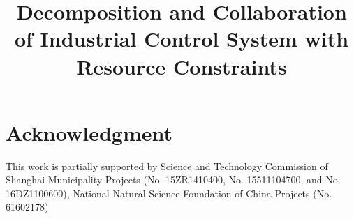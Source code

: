 \documentclass[conference]{IEEEtran}
\begin{document}

\title{Decomposition and Collaboration of Industrial Control System with Resource Constraints}




\maketitle


\IEEEpeerreviewmaketitle


%

%
%




\section*{Acknowledgment}
This work is partially supported by Science and Technology Commission of Shanghai Municipality Projects (No. 15ZR1410400, No. 15511104700, and No. 16DZ1100600), National Natural Science Foundation of China Projects (No. 61602178)




\end{document}
